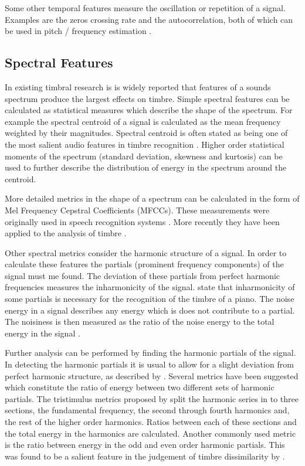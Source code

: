 		Some other temporal features measure the oscillation or repetition of a signal. Examples are the zeros
		crossing rate and the autocorrelation, both of which can be used in pitch / frequency estimation
		\citep{mcleod2005a}.

	\subsection{Spectral Features}
	\label{sec:Timbre-LowLevelFeatures-Spectral}
		In existing timbral research is is widely reported that features of a sounds spectrum produce the largest
		effects on timbre. Simple spectral features can be calculated as statistical measures which describe the
		shape of the spectrum. For example the spectral centroid of a signal is calculated as the mean frequency
		weighted by their magnitudes. Spectral centroid is often stated as being one of the most salient audio
		features in timbre recognition \citep{freed1990auditory, lakatos2000a}. Higher order statistical moments of
		the spectrum (standard deviation, skewness and kurtosis) can be used to further describe the distribution of
		energy in the spectrum around the centroid.

		More detailed metrics in the shape of a spectrum can be calculated in the form of Mel Frequency Cepstral
		Coefficients (MFCCs). These measurements were originally used in speech recognition systems
		\citep{davis1980comparison}. More recently they have been applied to the analysis of timbre
		\citep{depoli1997sonological}. 

		Other spectral metrics consider the harmonic structure of a signal. In order to calculate these features the
		partials (prominent frequency components) of the signal must me found. The deviation of these partials from
		perfect harmonic frequencies measures the inharmonicity of the signal. \citet{fletcher1962quality} state
		that inharmonicity of some partials is necessary for the recognition of the timbre of a piano. The noise
		energy in a signal describes any energy which is does not contribute to a partial. The noisiness is then
		measured as the ratio of the noise energy to the total energy in the signal \citep{serra1998sound}.

		Further analysis can be performed by finding the harmonic partials of the signal. In detecting the harmonic
		partials it is usual to allow for a slight deviation from perfect harmonic structure, as described by
		\citet{peeters2011the}. Several metrics have been suggested which constitute the ratio of energy between two
		different sets of harmonic partials. The tristimulus metrics proposed by \citet{pollard1982a} split the
		harmonic series in to three sections, the fundamental frequency, the second through fourth harmonics and,
		the rest of the higher order harmonics. Ratios between each of these sections and the total energy in the
		harmonics are calculated. Another commonly used metric is the ratio between energy in the odd and even order
		harmonic partials. This was found to be a salient feature in the judgement of timbre dissimilarity by
		\citet{hall2010importance}. 

